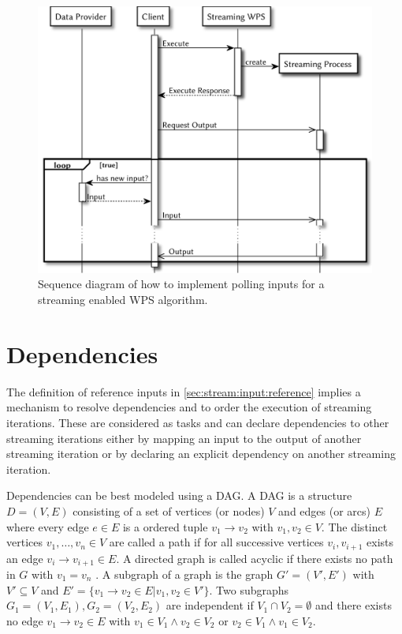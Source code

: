       \begin{figure}[!htb]
        \centering
        \includegraphics[width = 0.73521126760563382\linewidth]{figures/sequence-diagram-polling.pdf}
        \caption{\label{fig:sd:polling}Sequence diagram of how to implement polling inputs for a streaming enabled WPS algorithm.}
      \end{figure}

  \section{Dependencies}
    \label{sec:stream:dependencies}
    The definition of reference inputs in \cref{sec:stream:input:reference} implies a mechanism to resolve dependencies and to order the execution of streaming iterations. These are considered as tasks and can declare dependencies to other streaming iterations either by mapping an input to the output of another streaming iteration or by declaring an explicit dependency on another streaming iteration.

    Dependencies can be best modeled using a \ac{DAG}. A \ac{DAG} is a structure $D=(V, E)$ consisting of a set of vertices (or nodes) $V$ and edges (or arcs) $E$ where every edge $e\in E$ is a ordered tuple $v_1 \rightarrow v_2$ with $v_1, v_2 \in V$. The distinct vertices $v_1,\dots,v_n\in V$ are called a path if for all successive vertices $v_i, v_{i+1}$ exists an edge $v_i \rightarrow v_{i+1} \in E$. A directed graph is called acyclic if there exists no path in $G$ with $v_1 = v_n$ \citep{jungnickel2012graphs}. A subgraph of a graph is the graph $G' = (V', E')$ with $V'\subseteq V$ and $E' = \{v_1 \rightarrow v_2 \in E | v_1, v_2\in V'\}$. Two subgraphs $G_1 = (V_1, E_1), G_2 = (V_2, E_2)$ are independent if $V_1 \cap V_2 = \emptyset$ and there exists no edge $v_1\rightarrow v_2\in E$ with $v_1\in V_1 \wedge v_2\in V_2$ or $v_2\in V_1 \wedge v_1\in V_2$.

